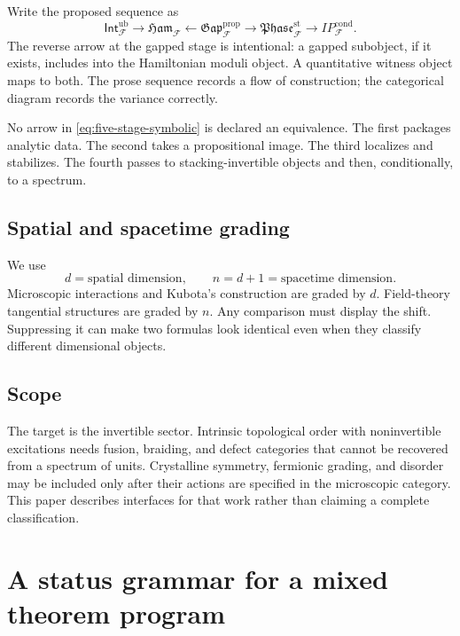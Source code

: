 \documentclass[12pt]{article}
\theoremstyle{definition}
\theoremstyle{remark}
\newcommand{\F}{\mathcal F}
\newcommand{\Ham}{\mathfrak{Ham}}
\newcommand{\Gap}{\mathfrak{Gap}}
\newcommand{\Phase}{\mathfrak{Phase}}
\newcommand{\IP}{\mathit{IP}}
\begin{document}
Write the proposed sequence as
\begin{equation}
\mathsf{Int}^{\mathrm{ub}}_{\F}
\longrightarrow
\Ham_{\F}
\longleftarrow
\Gap^{\mathrm{prop}}_{\F}
\longrightarrow
\Phase^{\mathrm{st}}_{\F}
\longrightarrow
\IP^{\mathrm{cond}}_{\F}.
\label{eq:five-stage-symbolic}
\end{equation}
The reverse arrow at the gapped stage is intentional: a gapped subobject,
if it exists, includes into the Hamiltonian moduli object.  A quantitative
witness object maps to both.  The prose sequence records a flow of
construction; the categorical diagram records the variance correctly.

No arrow in \cref{eq:five-stage-symbolic} is declared an equivalence.  The
first packages analytic data.  The second takes a propositional image.  The
third localizes and stabilizes.  The fourth passes to stacking-invertible
objects and then, conditionally, to a spectrum.

\subsection{Spatial and spacetime grading}

We use
\begin{equation}
d=\text{spatial dimension},
\qquad
n=d+1=\text{spacetime dimension}.
\label{eq:dimension-convention}
\end{equation}
Microscopic interactions and Kubota's construction are graded by $d$.
Field-theory tangential structures are graded by $n$.  Any comparison must
display the shift.  Suppressing it can make two formulas look identical even
when they classify different dimensional objects.

\subsection{Scope}

The target is the invertible sector.  Intrinsic topological order with
noninvertible excitations needs fusion, braiding, and defect categories that
cannot be recovered from a spectrum of units.  Crystalline symmetry,
fermionic grading, and disorder may be included only after their actions are
specified in the microscopic category.  This paper describes interfaces for
that work rather than claiming a complete classification.

\section{A status grammar for a mixed theorem program}
\end{document}
